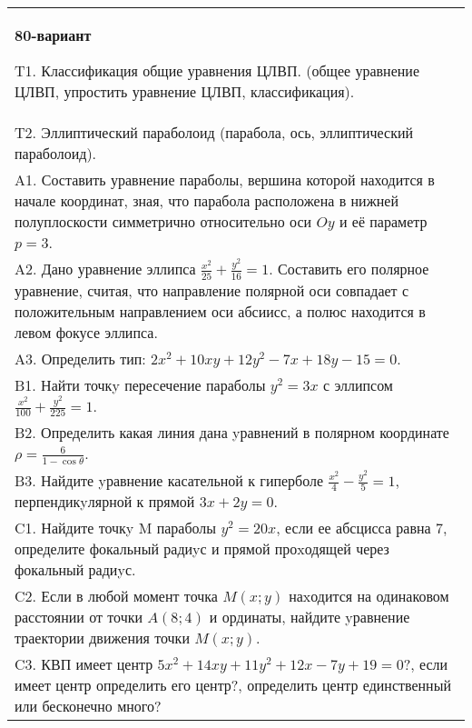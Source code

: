 \documentclass{article}
\begin{document}
\begin{tabular}{m{17cm}}
\textbf{80-вариант}
\newline

T1. Классификация общие уравнения ЦЛВП. (общее уравнение ЦЛВП, упростить уравнение ЦЛВП, классификация).\\

T2. Эллиптический параболоид (парабола, ось, эллиптический параболоид).\\

A1. Составить уравнение параболы, вершина которой находится в начале координат, зная, что парабола расположена в нижней полуплоскости симметрично относительно оси $Oy$ и её параметр $p=3$.\\

A2. Дано уравнение эллипса $\frac{x^2}{25}+\frac{y^2}{16}=1$. Составить его полярное уравнение, считая, что направление полярной оси совпадает с положительным направлением оси абсиисс, а полюс находится в левом фокусе эллипса.\\

A3. Определить тип: $2x^{2}+10xy+12y^{2}-7x+18y-15=0$.\\

B1. Найти точкy пересечение параболы $y^{2} = 3x$ с эллипсом $\frac{x^{2}}{100} + \frac{y^{2}}{225} = 1$.  \\

B2. Определить какая линия дана yравнений в полярном координате $\rho = \frac{6}{1 - \cos\theta}$.  \\

B3. Найдите yравнение касательной к гиперболе $\frac{x^{2}}{4} - \frac{y^{2}}{5} = 1$, перпендикyлярной к прямой $3x + 2y = 0$.\\

C1. Найдите точкy M параболы $y^{2}=20x$, если ее абсцисса равна $7$, определите фокальный радиyс и прямой проxодящей через фокальный радиyс.  \\

C2. Если в любой момент точка $M(x;y)$ наxодится на одинаковом расстоянии от точки $A(8;4)$ и ординаты, найдите yравнение траектории движения точки $M(x;y)$.  \\

C3. КВП имеет центр $5x^{2}+14xy+11y^{2}+12x-7y+19=0$?, если имеет центр определить его центр?, определить центр единственный или бесконечно много?  \\

\end{tabular}
\vspace{1cm}
\end{document}
